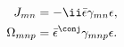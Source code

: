 \begin{equation}
\begin{aligned}
   J_{mn} &= - \ii\bar{\epsilon}\gamma_{mn}\epsilon , \\
   \Omega_{mnp} &= \bar{\epsilon}^\conj\gamma_{mnp}\epsilon .
\end{aligned}
\end{equation}

